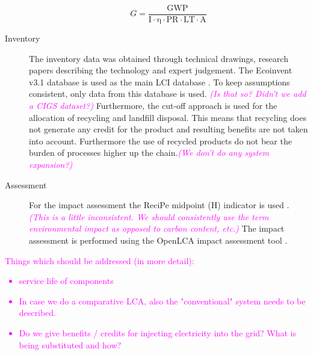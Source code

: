 \begin{description}
\begin{equation}
G=\frac{{\mathrm{GWP}}}{{\mathrm{I \cdot \eta  \cdot PR \cdot LT \cdot A}}}
\label{eq:solar}
\end{equation}



\item[Inventory] The inventory data was obtained through technical drawings, research papers describing the technology and expert judgement. The Ecoinvent v3.1 database is used as the main LCI database \cite{frischknecht2005ecoinvent}. To keep assumptions consistent, only data from this database is used. \textcolor{magenta}{\textit{(Is that so? Didn't we add a CIGS dataset?)}} Furthermore, the cut-off approach is used for the allocation of recycling and landfill disposal. This means that recycling does not generate any credit for the product and resulting benefits are not taken into account. Furthermore the use of recycled products do not bear the burden of processes higher up the chain.\textcolor{magenta}{\textit{(We don't do any system expansion?)}}\\



\item[Assessment] For the impact assessment the ReciPe midpoint (H) indicator is used \cite{zelm2009recipe}. \textcolor{magenta}{\textit{(This is a little inconsistent. We should consistently use the term environmental impact as opposed to carbon content, etc.)}} The impact assessment is performed using the OpenLCA impact assessment tool \cite{ciroth2007ict}.\\


\end{description}

\textcolor{magenta}{
Things which should be addressed (in more detail):
\begin{itemize}
\item service life of components
\item In case we do a comparative LCA, also the "conventional" system needs to be described.
\item Do we give benefits / credits for injecting electricity into the grid? What is being substituted and how?
\end{itemize}}

